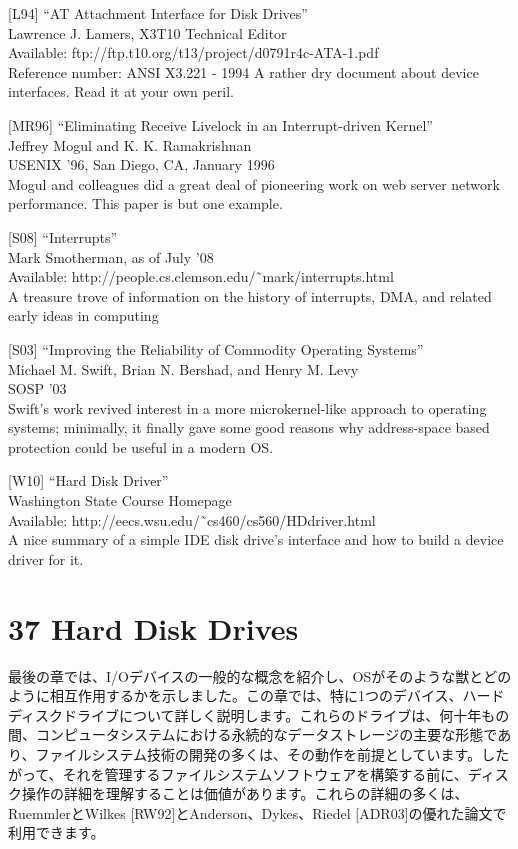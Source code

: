 {[}L94{]} ``AT Attachment Interface for Disk Drives''\\
Lawrence J. Lamers, X3T10 Technical Editor\\
Available: ftp://ftp.t10.org/t13/project/d0791r4c-ATA-1.pdf\\
Reference number: ANSI X3.221 - 1994 A rather dry document about device
interfaces. Read it at your own peril.

{[}MR96{]} ``Eliminating Receive Livelock in an Interrupt-driven
Kernel''\\
Jeffrey Mogul and K. K. Ramakrishnan\\
USENIX '96, San Diego, CA, January 1996\\
Mogul and colleagues did a great deal of pioneering work on web server
network performance. This paper is but one example.

{[}S08{]} ``Interrupts''\\
Mark Smotherman, as of July '08\\
Available: http://people.cs.clemson.edu/˜mark/interrupts.html\\
A treasure trove of information on the history of interrupts, DMA, and
related early ideas in computing

{[}S03{]} ``Improving the Reliability of Commodity Operating Systems''\\
Michael M. Swift, Brian N. Bershad, and Henry M. Levy\\
SOSP '03\\
Swift's work revived interest in a more microkernel-like approach to
operating systems; minimally, it finally gave some good reasons why
address-space based protection could be useful in a modern OS.

{[}W10{]} ``Hard Disk Driver''\\
Washington State Course Homepage\\
Available: http://eecs.wsu.edu/˜cs460/cs560/HDdriver.html\\
A nice summary of a simple IDE disk drive's interface and how to build a
device driver for it.

\newpage

\hypertarget{hard-disk-drives}{%
\section*{37 Hard Disk Drives}\label{hard-disk-drives}}

最後の章では、I/Oデバイスの一般的な概念を紹介し、OSがそのような獣とどのように相互作用するかを示しました。この章では、特に1つのデバイス、ハードディスクドライブについて詳しく説明します。これらのドライブは、何十年もの間、コンピュータシステムにおける永続的なデータストレージの主要な形態であり、ファイルシステム技術の開発の多くは、その動作を前提としています。したがって、それを管理するファイルシステムソフトウェアを構築する前に、ディスク操作の詳細を理解することは価値があります。これらの詳細の多くは、RuemmlerとWilkes
{[}RW92{]}とAnderson、Dykes、Riedel
{[}ADR03{]}の優れた論文で利用できます。

